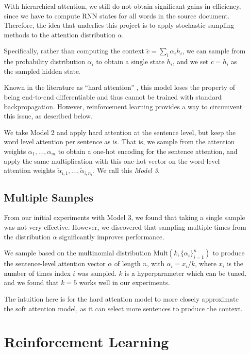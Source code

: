 \documentclass[11pt]{report}
\begin{document}
With hierarchical attention, we still do not obtain significant gains in efficiency, since we have to compute RNN states for all words in the source document. Therefore, the idea that underlies this project is to apply stochastic sampling methods to the attention distribution $\alpha$.

Specifically, rather than computing the context $\widetilde{c} = \sum_i \alpha_i h_i$, we can sample from the probability distribution $\alpha_i$ to obtain a single state $h_i$, and we set $\widetilde{c} = h_i$ as the sampled hidden state.

Known in the literature as ``hard attention'' \citep{xu2015captioning}, this model loses the property of being end-to-end differentiable and thus cannot be trained with standard backpropagation. However, reinforcement learning provides a way to circumvent this issue, as described below.

We take Model 2 and apply hard attention at the sentence level, but keep the word level attention per sentence as is. That is, we sample from the attention weights $\alpha_1, \ldots, \alpha_m$ to obtain a one-hot encoding for the sentence attention, and apply the same multiplication with this one-hot vector on the word-level attention weights $\widetilde{\alpha}_{i,1}, \ldots, \widetilde{\alpha}_{i,n_i}$. We call this \emph{Model 3}.


\subsection{Multiple Samples}

From our initial experiments with Model 3, we found that taking a single sample was not very effective. However, we discovered that sampling multiple times from the distribution $\alpha$ significantly improves performance.

We sample based on the multinomial distribution $\mathrm{Mult}(k, \{\alpha_i\}_{i=1}^n)$ to produce the sentence-level attention vector $\alpha$ of length $n$, with $\alpha_i = x_i / k$, where $x_i$ is the number of times index $i$ was sampled. $k$ is a hyperparameter which can be tuned, and we found that $k=5$ works well in our experiments.

The intuition here is for the hard attention model to more closely approximate the soft attention model, as it can select more sentences to produce the context.

\section{Reinforcement Learning}
\end{document}
